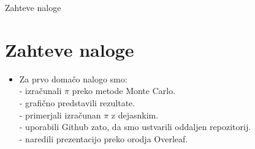 \begin{frame}{Zahteve naloge}
\section{Zahteve naloge}
\begin{itemize}

    \item Za prvo domačo nalogo smo:\\
    
     - izračunali $\pi$ preko metode Monte Carlo.\\
     - grafično predstavili rezultate.\\
     - primerjali izračunan $\pi$ z dejasnkim.\\
     - uporabili Github zato, da smo ustvarili oddaljen repozitorij.\\
     - naredili prezentacijo preko orodja Overleaf.\\



\end{itemize}
\end{frame}